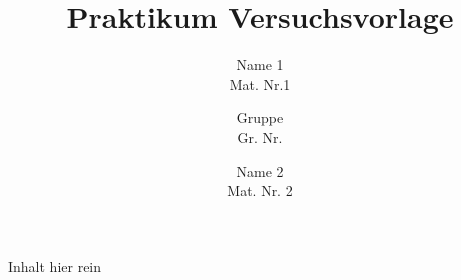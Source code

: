 
\title{Praktikum Versuchsvorlage}
\author{Name 1\\Mat. Nr.1\and Gruppe\\Gr. Nr.\and Name 2\\Mat. Nr. 2}


\sffamily
\maketitle
\tableofcontents
\pagebreak

Inhalt hier rein

